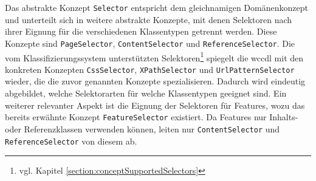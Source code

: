     Das abstrakte Konzept \texttt{Selector} entspricht dem gleichnamigen Domänenkonzept
    und unterteilt sich in weitere abstrakte Konzepte,
    mit denen Selektoren nach ihrer Eignung für die verschiedenen Klassentypen getrennt werden.
    Diese Konzepte sind \texttt{PageSelector}, \texttt{ContentSelector} und \texttt{ReferenceSelector}.
    Die vom Klassifizierungssystem unterstützten
    Selektoren\footnote{vgl. Kapitel \ref{section:conceptSupportedSelectors}}
    spiegelt die \gls{wccdl} mit den konkreten Konzepten
    \texttt{CssSelector}, \texttt{XPathSelector} und \texttt{UrlPatternSelector} wieder,
    die die zuvor genannten Konzepte spezialisieren.
    Dadurch wird eindeutig abgebildet, welche Selektorarten für welche Klassentypen geeignet sind.
    Ein weiterer relevanter Aspekt ist die Eignung der Selektoren für Features,
    wozu das bereits erwähnte Konzept \texttt{FeatureSelector} existiert.
    Da Features nur Inhalts- oder Referenzklassen verwenden können,
    leiten nur \texttt{ContentSelector} und \texttt{ReferenceSelector} von diesem ab.
    